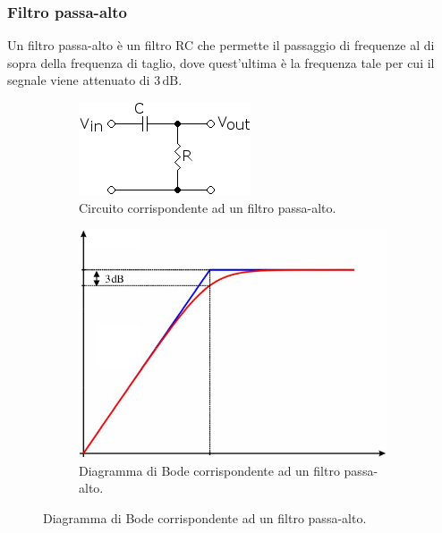 \documentclass[a4paper]{article}
\begin{document}
			\subsubsection{Filtro passa-alto}
				Un filtro passa-alto è un filtro RC che permette il passaggio di frequenze al di sopra della frequenza di taglio, dove quest'ultima è la frequenza tale per cui il segnale viene attenuato di $ 3 \, \mathrm{dB} $.
				\begin{figure}[h!]
					\centering
					\begin{subfigure}{0.4\textwidth}
						\centering
						\includegraphics[scale=0.6]{filtroPassaAlto}
						\caption{Circuito corrispondente ad un filtro passa-alto.}
					\end{subfigure}
					\begin{subfigure}{0.4\textwidth}
						\centering
						\includegraphics[scale=0.4]{filtroPassaAltoBodeTeoria}
						\caption{Diagramma di Bode corrispondente ad un filtro passa-alto.}
					\end{subfigure}
					\label{fig:filtroPassaAlto}
				\end{figure}
				\newpage
\end{document}
